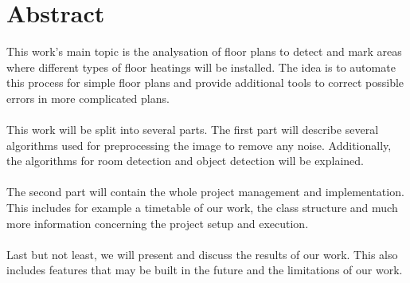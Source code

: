 \section{Abstract}
This work's main topic is the analysation of floor plans to detect and mark areas where different types of floor heatings will be installed. The idea is to automate this process for simple floor plans and provide additional tools to correct possible errors in more complicated plans.
\\\\
This work will be split into several parts. The first part will describe several algorithms used for preprocessing the image to remove any noise. Additionally, the algorithms for room detection and object detection will be explained.
\\\\
The second part will contain the whole project management and implementation. This includes for example a timetable of our work, the class structure and much more information concerning the project setup and execution.
\\\\
Last but not least, we will present and discuss the results of our work. This also includes features that may be built in the future and the limitations of our work.